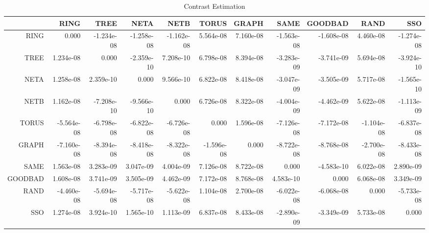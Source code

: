\documentclass[a4paper,10pt]{article}
\begin{document}
\begin{landscape}
\begin{table}[!htp]
\centering\tiny
\caption{Contrast Estimation}
\begin{tabular}{
|r|r|r|r|r|r|r|r|r|r|r|}
\hline
 & RING& TREE& NETA& NETB& TORUS& GRAPH& SAME& GOODBAD& RAND& SSO\\
\hline
 RING&0.000&-1.234e-08&-1.258e-08&-1.162e-08&5.564e-08&7.160e-08&-1.563e-08&-1.608e-08&4.460e-08&-1.274e-08\\
\hline
 TREE&1.234e-08&0.000&-2.359e-10&7.208e-10&6.798e-08&8.394e-08&-3.283e-09&-3.741e-09&5.694e-08&-3.924e-10\\
\hline
 NETA&1.258e-08&2.359e-10&0.000&9.566e-10&6.822e-08&8.418e-08&-3.047e-09&-3.505e-09&5.717e-08&-1.565e-10\\
\hline
 NETB&1.162e-08&-7.208e-10&-9.566e-10&0.000&6.726e-08&8.322e-08&-4.004e-09&-4.462e-09&5.622e-08&-1.113e-09\\
\hline
 TORUS&-5.564e-08&-6.798e-08&-6.822e-08&-6.726e-08&0.000&1.596e-08&-7.126e-08&-7.172e-08&-1.104e-08&-6.837e-08\\
\hline
 GRAPH&-7.160e-08&-8.394e-08&-8.418e-08&-8.322e-08&-1.596e-08&0.000&-8.722e-08&-8.768e-08&-2.700e-08&-8.433e-08\\
\hline
 SAME&1.563e-08&3.283e-09&3.047e-09&4.004e-09&7.126e-08&8.722e-08&0.000&-4.583e-10&6.022e-08&2.890e-09\\
\hline
 GOODBAD&1.608e-08&3.741e-09&3.505e-09&4.462e-09&7.172e-08&8.768e-08&4.583e-10&0.000&6.068e-08&3.349e-09\\
\hline
 RAND&-4.460e-08&-5.694e-08&-5.717e-08&-5.622e-08&1.104e-08&2.700e-08&-6.022e-08&-6.068e-08&0.000&-5.733e-08\\
\hline
 SSO&1.274e-08&3.924e-10&1.565e-10&1.113e-09&6.837e-08&8.433e-08&-2.890e-09&-3.349e-09&5.733e-08&0.000\\
\hline

\end{tabular}
\end{table}

\newpage


\end{landscape}
\end{document}
